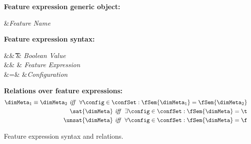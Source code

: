 \begin{figure}
\textbf{Feature expression generic object:}
\begin{syntax}
\synDef \fName \fSet &\textit{Feature Name}
\end{syntax}

\medskip
\textbf{Feature expression syntax:}
\begin{syntax}
\synDef \bTag \bSet &\eqq& \t \myOR \f & \textit{Boolean Value}\\
\synDef \dimMeta \ffSet &\eqq& \bTag \myOR \fName \myOR \neg \fName \myOR \dimMeta \wedge \dimMeta \myOR \dimMeta \vee \dimMeta & \textit{Feature Expression}\\
\synDef \config \confSet &=& \fSet \to \bSet &\textit{Configuration}
\end{syntax}


\medskip
\textbf{Relations over feature expressions:}
\begin{alignat*}{1}
\dimMeta_1 \equiv \dimMeta_2 \textit{ iff \ } \forall \config \in \confSet: \fSem {\dimMeta_1} = \fSem {\dimMeta_2}\\
\sat {\dimMeta} \textit{ iff \ } \exists \config \in \confSet: \fSem {\dimMeta} = \t\\
\unsat {\dimMeta} \textit{ iff \ } \forall \config \in \confSet: \fSem {\dimMeta} = \f
\end{alignat*}

\begin{comment}
\medskip
\textbf{Configuration constraint:}
\begin{equation*}
\forall \overrightarrow{f_i} \in c :
\bigvee_{1\leq j \leq |f_i|}(\neg o_j \wedge \bigwedge_{\substack{k\not = j\\1 \leq k\leq |f_i|}} o_k)
= \prog{true}
\end{equation*}
\end{comment}

\caption{Feature expression syntax and relations.
}
\label{fig:fexp-def}
\end{figure}

